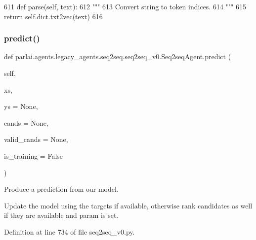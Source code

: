\begin{DoxyCode}
611     \textcolor{keyword}{def }parse(self, text):
612         \textcolor{stringliteral}{"""}
613 \textcolor{stringliteral}{        Convert string to token indices.}
614 \textcolor{stringliteral}{        """}
615         \textcolor{keywordflow}{return} self.dict.txt2vec(text)
616 
\end{DoxyCode}
\mbox{\label{classparlai_1_1agents_1_1legacy__agents_1_1seq2seq_1_1seq2seq__v0_1_1Seq2seqAgent_aadec879f7d8daa6451076e4fb358715b}} 
\subsubsection{\texorpdfstring{predict()}{predict()}}
{\footnotesize\ttfamily def parlai.\+agents.\+legacy\+\_\+agents.\+seq2seq.\+seq2seq\+\_\+v0.\+Seq2seq\+Agent.\+predict (\begin{DoxyParamCaption}\item[{}]{self,  }\item[{}]{xs,  }\item[{}]{ys = {\ttfamily None},  }\item[{}]{cands = {\ttfamily None},  }\item[{}]{valid\+\_\+cands = {\ttfamily None},  }\item[{}]{is\+\_\+training = {\ttfamily False} }\end{DoxyParamCaption})}

\begin{DoxyVerb}Produce a prediction from our model.

Update the model using the targets if available, otherwise rank candidates as
well if they are available and param is set.
\end{DoxyVerb}
 

Definition at line 734 of file seq2seq\+\_\+v0.\+py.


